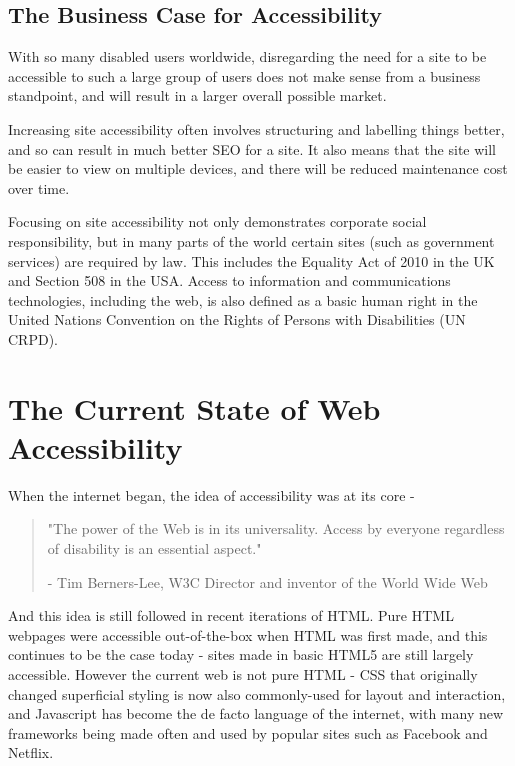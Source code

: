 \documentclass[ %
                    author={Aleena Baig},
                supervisor={Dr Simon Lock},
                    degree={BSc},
                     title={On Making Web Accessible Graphs},
                  subtitle={},
                      year={2019} ]{dissertation}
\begin{document}
\subsection{The Business Case for Accessibility}

With so many disabled users worldwide, disregarding the need for a site to be accessible to such a large group of users does not make sense from a business standpoint, and will result in a larger overall possible market.

Increasing site accessibility often involves structuring and labelling things better, and so can result in much better SEO for a site. It also means that the site will be easier to view on multiple devices, and there will be reduced maintenance cost over time.\cite{WAIaccessibilityintro}

Focusing on site accessibility not only demonstrates corporate social responsibility, but in many parts of the world certain sites (such as government services) are required by law. This includes the Equality Act of 2010 \cite{eqa2010} in the UK and Section 508 \cite{section508} in the USA. Access to information and communications technologies, including the web, is also defined as a basic human right in the United Nations Convention on the Rights of Persons with Disabilities (UN CRPD). \cite{accessibilityUN}

\section{The Current State of Web Accessibility}

When the internet began, the idea of accessibility was at its core -

\begin{quote}
\centering
"The power of the Web is in its universality. Access by everyone regardless of disability is an essential aspect."

- Tim Berners-Lee, W3C Director and inventor of the World Wide Web
\end{quote}
%
And this idea is still followed in recent iterations of HTML. Pure HTML webpages were accessible out-of-the-box when HTML was first made, and this continues to be the case today - sites made in basic HTML5 are still largely accessible. However the current web is not pure HTML - CSS that originally changed superficial styling is now also commonly-used for layout and interaction, and Javascript has become the de facto language of the internet, with many new frameworks being made often and used by popular sites such as Facebook and Netflix.
\end{document}

